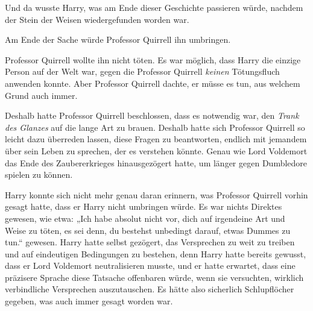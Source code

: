 Und da wusste Harry, was am Ende dieser Geschichte passieren würde, nachdem der Stein der Weisen wiedergefunden worden war.

Am Ende der Sache würde Professor Quirrell ihn umbringen.

Professor Quirrell wollte ihn nicht töten. Es war möglich, dass Harry die einzige Person auf der Welt war, gegen die Professor Quirrell \emph{keinen} Tötungsfluch anwenden konnte. Aber Professor Quirrell dachte, er müsse es tun, aus welchem Grund auch immer.

Deshalb hatte Professor Quirrell beschlossen, dass es notwendig war, den \emph{Trank des Glanzes} auf die lange Art zu brauen. Deshalb hatte sich Professor Quirrell so leicht dazu überreden lassen, diese Fragen zu beantworten, endlich mit jemandem über sein Leben zu sprechen, der es verstehen könnte. Genau wie Lord Voldemort das Ende des Zaubererkrieges hinausgezögert hatte, um länger gegen Dumbledore spielen zu können.

Harry konnte sich nicht mehr genau daran erinnern, was Professor Quirrell vorhin gesagt hatte, dass er Harry nicht umbringen würde. Es war nichts Direktes gewesen, wie etwa:
„Ich habe absolut nicht vor, dich auf irgendeine Art und Weise zu töten, es sei denn, du bestehst unbedingt darauf, etwas Dummes zu tun.“ gewesen. Harry hatte selbst gezögert, das Versprechen zu weit zu treiben und auf eindeutigen Bedingungen zu bestehen, denn Harry hatte bereits gewusst, dass er Lord Voldemort neutralisieren musste, und er hatte erwartet, dass eine präzisere Sprache diese Tatsache offenbaren würde, wenn sie versuchten, wirklich verbindliche Versprechen auszutauschen.
Es hätte also sicherlich Schlupflöcher gegeben, was auch immer gesagt worden war.

